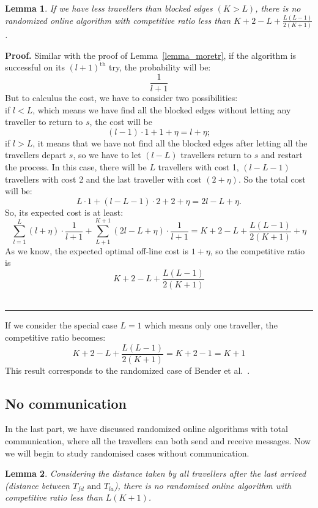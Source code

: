 \documentclass[letter-size, 11pt]{article}
\newtheorem{lemma}{Lemma}
\newenvironment{proof}[1][Proof]{\textbf{#1.} }{\ \rule{0.5em}{0.5em}}
\begin{document}
\begin{lemma}
If we have less travellers than blocked edges $ (K > L )$, there is no randomized online algorithm with competitive ratio less than $
K+2-L+ \frac{L(L-1)}{2(K+1)}$.
\end{lemma}

\begin{proof}
Similar with the proof of Lemma~\ref{lemma_moretr}, if the algorithm is successful on its $(l+1)^{\text{th}}$ try, the probability will be: 
\[
\frac{1}{l+1}
\]
But to calculus the cost, we have to consider two possibilities: 
\\if $l < L$, which means we have find all the blocked edges without letting any traveller to return to $s$, the cost will be 
\[
(l-1)\cdot1 + 1 +\eta = l + \eta;
\]
if $l > L$, it means that we have not find all the blocked edges after letting all the travellers depart $s$,  so we have to let $(l-L)$ travellers return to $s$ and restart the process. In this case, there will be $L$ travellers with cost 1, $(l-L-1)$ travellers with cost 2 and the last traveller with cost $(2+\eta)$. So the total cost will be:
\[
L\cdot 1 + (l-L-1)\cdot2 + 2 +\eta = 2l - L + \eta .
\]
So, its expected cost is at least:
\[
\sum_{l=1}^{L}(l+\eta)\cdot \frac{1}{l+1}  +  \sum_{L+1}^{K+1}(2l-L+\eta)\cdot \frac{1}{l+1}
 =K+2-L+ \frac{L(L-1)}{2(K+1)} + \eta
\]
As we know, the expected optimal off-line cost is $1 + \eta$, so the competitive ratio is 
\[
K+2-L+ \frac{L(L-1)}{2(K+1)}
\]
\end{proof}

If we consider the special case $L=1$ which means only one traveller, the competitive ratio becomes:
\[
K+2-L+ \frac{L(L-1)}{2(K+1)} = K+2-1 = K+1
\]
This result corresponds to the randomized case of Bender et al.~\cite{BeWe15}.

\subsection{No communication}

In the last part, we have discussed randomized online algorithms with total communication, where all the travellers can both send and receive messages. Now we will begin to study randomised cases without communication. 

\begin{lemma}
Considering the distance taken by all travellers after the last arrived (distance between $T_{fd} \mbox{\ and } T_{la}$), there is no randomized online algorithm with competitive ratio less than $ L(K+1)$.
\end{lemma}
\end{document}

